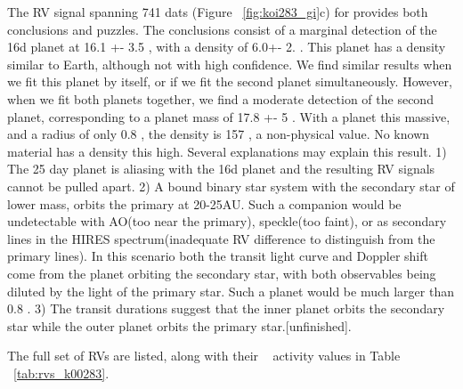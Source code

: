 \documentclass{emulateapj}
\begin{document}
The RV signal spanning 741 dats (Figure ~\ref{fig:koi283_gi}c) for \koitwoeightthree provides both conclusions and puzzles. The conclusions consist of a marginal detection of the 16d planet at  16.1 +- 3.5  \mearthe, with a density of 6.0+- 2. \gcc.  This planet has a density similar to Earth, although not with high confidence.  We find similar results when we fit this planet by itself, or if we fit the second planet simultaneously. However, when we fit both planets together, we find a moderate detection of the second planet, corresponding to a planet mass of 17.8 +- 5 \mearthe. With a planet this massive, and a radius of only 0.8 \rearthe, the density is 157 \gcc, a non-physical value. No known material has a density this high. Several explanations may explain this result. 1) The 25 day planet is aliasing with the 16d planet and the resulting RV signals cannot be pulled apart.  2) A bound binary star system with the secondary star of lower mass, orbits the primary at 20-25AU. Such a companion would be undetectable with AO(too near the primary), speckle(too faint), or as secondary lines in the  HIRES spectrum(inadequate RV difference to distinguish from the primary lines). In this scenario both the transit light curve and Doppler shift come from the planet orbiting the secondary star, with both observables being diluted by the light of the primary star. Such a planet would be much larger than 0.8 \rearthe. 3)  The transit durations suggest that the inner planet orbits the secondary star while the outer planet orbits the primary star.[unfinished].

The full set of RVs are listed, along with their \rphk~ activity values in Table ~\ref{tab:rvs_k00283}.





\end{document}
